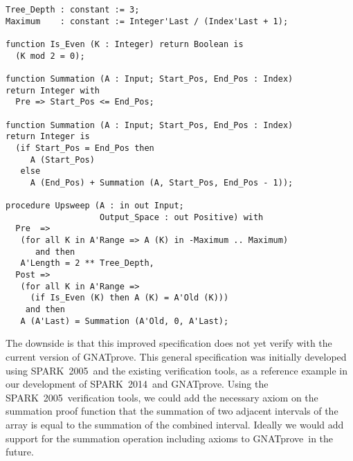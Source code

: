 \documentclass[sttt,draft]{svjour}
\newcommand{\gnatprove}{GNATprove\xspace}
\newcommand{\oldspark}{SPARK~2005\xspace}
\newcommand{\newspark}{SPARK~2014\xspace}
\begin{document}
\begin{footnotesize}
\begin{verbatim}
Tree_Depth : constant := 3;
Maximum    : constant := Integer'Last / (Index'Last + 1);

function Is_Even (K : Integer) return Boolean is
  (K mod 2 = 0);

function Summation (A : Input; Start_Pos, End_Pos : Index)
return Integer with
  Pre => Start_Pos <= End_Pos;

function Summation (A : Input; Start_Pos, End_Pos : Index)
return Integer is
  (if Start_Pos = End_Pos then
     A (Start_Pos)
   else
     A (End_Pos) + Summation (A, Start_Pos, End_Pos - 1));

procedure Upsweep (A : in out Input;
                   Output_Space : out Positive) with
  Pre  =>
   (for all K in A'Range => A (K) in -Maximum .. Maximum)
      and then
   A'Length = 2 ** Tree_Depth,
  Post =>
   (for all K in A'Range =>
     (if Is_Even (K) then A (K) = A'Old (K)))
    and then
   A (A'Last) = Summation (A'Old, 0, A'Last);
\end{verbatim}
\end{footnotesize}


The downside is that this improved specification does not yet verify
with the current version of \gnatprove. This general specification was
initially developed using \oldspark\ and the existing verification
tools, as a reference example in our development of \newspark\ and
\gnatprove. Using the \oldspark\ verification tools, we could add the
necessary axiom on the summation proof function that the summation of
two adjacent intervals of the array is equal to the summation of the
combined interval. Ideally we would add support for the summation
operation including axioms to \gnatprove\ in the future.


\end{document}
